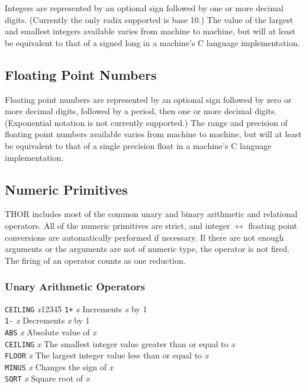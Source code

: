 	Integers are represented by an optional sign followed by one or more 
decimal digits.  (Currently the only radix supported is base 10.)
The value of the largest and smallest integers available
varies from machine to machine, but will at least be equivalent to that
of a signed long in a machine's C language implementation.

\subsection{Floating Point Numbers}

	Floating point numbers are represented by an optional sign followed
by zero or more decimal digits, followed by a period, then one or more
decimal digits. (Exponential notation is not currently supported.)  The
range and precision of floating point numbers available varies from
machine to machine, but will at least be equivalent to that of a single
precision float in a machine's C language implementation.



\subsection{Numeric Primitives}

	THOR includes most of the common unary and binary arithmetic and
relational operators.  All of the numeric primitives are strict, and
integer $\leftrightarrow$ floating point conversions
are automatically performed if necessary. 
If there are not enough arguments or the arguments
are not of numeric type, the operator is not fired.  The firing of an
operator counts as one reduction.

\subsubsection{Unary Arithmetic Operators}
\begin{tabbing}
{\tt CEILING} {\sl x}12345\=\kill
{\tt 1+} {\sl x} \>	Increments {\sl x} by 1\\
{\tt 1-} {\sl x} \>  Decrements {\sl x} by 1\\
{\tt ABS} {\sl x} \> Absolute value of {\sl x}\\
{\tt CEILING} {\sl x} \>	The smallest integer value greater than or
			equal to {\sl x}\\
{\tt FLOOR} {\sl x} \>	The largest integer value less than or equal to
			{\sl x}\\
{\tt MINUS} {\sl x} \>  Changes the sign of {\sl x}\\
{\tt SQRT} {\sl x} \> Square root of {\sl x}
\end{tabbing}


